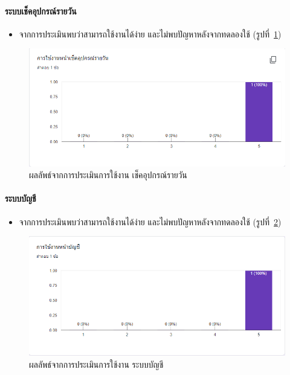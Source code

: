\paragraph{ระบบเช็คอุปกรณ์รายวัน}
\begin{itemize}
  \item จากการประเมินพบว่าสามารถใช้งานได้ง่าย และไม่พบปัญหาหลังจากทดลองใช้ (รูปที่~\ref{fig:Eval6})
\end{itemize}
\begin{figure}
  \begin{center}
    \includegraphics[width=\linewidth]{images/eval6.png}
  \end{center}
  \caption[ผลลัพธ์จากการประเมินการใช้งาน เช็คอุปกรณ์รายวัน]{ผลลัพธ์จากการประเมินการใช้งาน เช็คอุปกรณ์รายวัน}
  \label{fig:Eval6}
\end{figure}

\paragraph{ระบบบัญชี}
\begin{itemize}
  \item จากการประเมินพบว่าสามารถใช้งานได้ง่าย และไม่พบปัญหาหลังจากทดลองใช้ (รูปที่~\ref{fig:Eval7})
\end{itemize}
\begin{figure}
  \begin{center}
    \includegraphics[width=\linewidth]{images/eval7.png}
  \end{center}
  \caption[ผลลัพธ์จากการประเมินการใช้งาน ระบบบัญชี]{ผลลัพธ์จากการประเมินการใช้งาน ระบบบัญชี}
  \label{fig:Eval7}
\end{figure}

